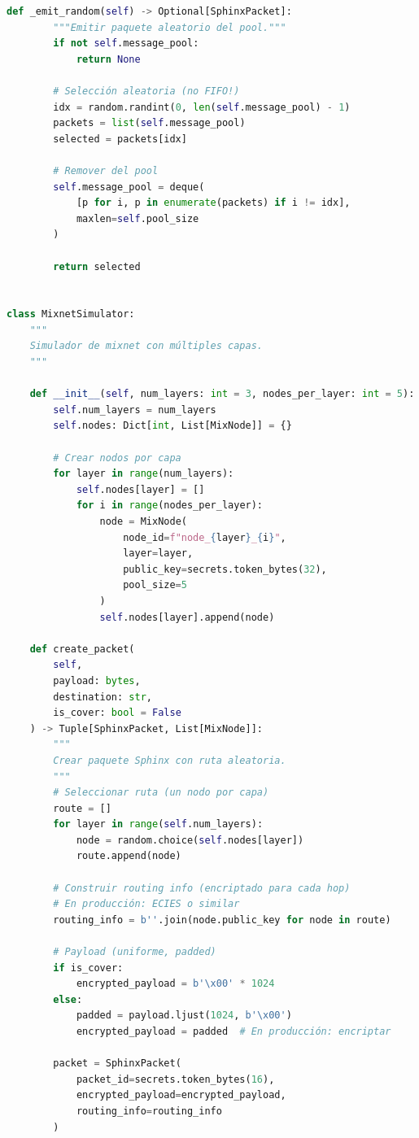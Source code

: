 \documentclass[11pt,a4paper,twoside]{book}
\theoremstyle{definition}
\theoremstyle{remark}
\begin{document}
\begin{lstlisting}[language=Python, caption={Simulación conceptual de Mixnet}]
    def _emit_random(self) -> Optional[SphinxPacket]:
        """Emitir paquete aleatorio del pool."""
        if not self.message_pool:
            return None
        
        # Selección aleatoria (no FIFO!)
        idx = random.randint(0, len(self.message_pool) - 1)
        packets = list(self.message_pool)
        selected = packets[idx]
        
        # Remover del pool
        self.message_pool = deque(
            [p for i, p in enumerate(packets) if i != idx],
            maxlen=self.pool_size
        )
        
        return selected


class MixnetSimulator:
    """
    Simulador de mixnet con múltiples capas.
    """
    
    def __init__(self, num_layers: int = 3, nodes_per_layer: int = 5):
        self.num_layers = num_layers
        self.nodes: Dict[int, List[MixNode]] = {}
        
        # Crear nodos por capa
        for layer in range(num_layers):
            self.nodes[layer] = []
            for i in range(nodes_per_layer):
                node = MixNode(
                    node_id=f"node_{layer}_{i}",
                    layer=layer,
                    public_key=secrets.token_bytes(32),
                    pool_size=5
                )
                self.nodes[layer].append(node)
    
    def create_packet(
        self,
        payload: bytes,
        destination: str,
        is_cover: bool = False
    ) -> Tuple[SphinxPacket, List[MixNode]]:
        """
        Crear paquete Sphinx con ruta aleatoria.
        """
        # Seleccionar ruta (un nodo por capa)
        route = []
        for layer in range(self.num_layers):
            node = random.choice(self.nodes[layer])
            route.append(node)
        
        # Construir routing info (encriptado para cada hop)
        # En producción: ECIES o similar
        routing_info = b''.join(node.public_key for node in route)
        
        # Payload (uniforme, padded)
        if is_cover:
            encrypted_payload = b'\x00' * 1024
        else:
            padded = payload.ljust(1024, b'\x00')
            encrypted_payload = padded  # En producción: encriptar
        
        packet = SphinxPacket(
            packet_id=secrets.token_bytes(16),
            encrypted_payload=encrypted_payload,
            routing_info=routing_info
        )
        

\end{lstlisting}
\end{document}
